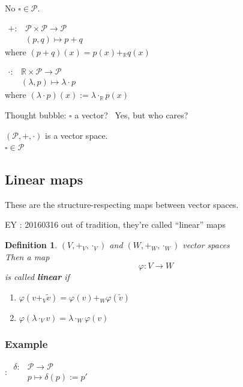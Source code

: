\documentclass[10pt]{amsart}
\newtheorem{definition}{Definition}
\begin{document}
\begin{multicols*}{2}
No $\square \in \mathcal{P}$.

$\begin{aligned} +:  & \mathcal{P} \times \mathcal{P} \to \mathcal{P} \\
& (p,q) \mapsto p+q \end{aligned}$  \\
where $(p+q)(x) = p(x) +_{\mathbb{R}} q(x)$

$\begin{aligned} 
\cdot : & \mathbb{R} \times \mathcal{P} \to \mathcal{P} \\
& (\lambda, p) \mapsto \lambda \cdot p \end{aligned}$ \\
where $(\lambda \cdot p)(x) := \lambda \cdot_{\mathbb{R}} p(x)$

Thought bubble: $\square$ a vector?  \qquad \, Yes, but who cares?

$(\mathcal{P}, + ,\cdot )$ is a vector space.   \\
$\square \in \mathcal{P}$

\subsection{Linear maps}

These are the structure-respecting maps between vector spaces.  

EY : 20160316 out of tradition, they're called ``linear'' maps

\begin{definition}
	$(V,+_V,\cdot_V)$ and $(W,+_W,\cdot_W)$ vector spaces \\
	Then a map
	\[
	\varphi : V \to W 
	\]
	is called \textbf{linear} if 
	\begin{enumerate}
		\item[(i)] $\varphi(v+_V \widetilde{v}) = \varphi(v) +_W \varphi(\widetilde{v}) $  
		\item[(ii)] $\varphi(\lambda \cdot_V v) = \lambda \cdot_W \varphi(v)$
	\end{enumerate}
\end{definition}

\subsubsection*{Example}:
$\begin{aligned}
\delta : & \mathcal{P} \to \mathcal{P}  \\
& p \mapsto \delta(p) := p' \end{aligned}$


\end{multicols*}
\end{document}
